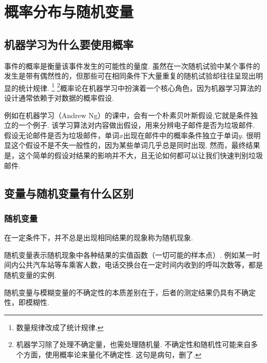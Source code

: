\section{概率分布与随机变量}
\label{ux6982ux7387ux5206ux5e03ux4e0eux968fux673aux53d8ux91cf}
\subsection{机器学习为什么要使用概率}
\label{ux673aux5668ux5b66ux4e60ux4e3aux4ec0ux4e48ux8981ux4f7fux7528ux6982ux7387}

事件的概率是衡量该事件发生的可能性的量度.
虽然在一次随机试验中某个事件的发生是带有偶然性的，但那些可在相同条件下大量重复的随机试验却往往呈现出明显的统计规律.
\footnote{数量规律改成了统计规律.}
\footnote{​机器学习除了处理不确定量，也需处理随机量.
  不确定性和随机性可能来自多个方面，使用概率论来量化不确定性.
  这句是病句，删了.}
​概率论在机器学习中扮演着一个核心角色，因为机器学习算法的设计通常依赖于对数据的概率假设.
\begin{remark}
  例如在机器学习（Andrew Ng）的课中，会有一个朴素贝叶斯假设,它就是条件独立的一个例子.
  该学习算法对内容做出假设，用来分辨电子邮件是否为垃圾邮件.
  假设无论邮件是否为垃圾邮件，单词$x$出现在邮件中的概率条件独立于单词$y$.
  很明显这个假设不是不失一般性的，因为某些单词几乎总是同时出现.
  然而，最终结果是，这个简单的假设对结果的影响并不大，且无论如何都可以让我们快速判别垃圾邮件.
\end{remark}

\subsection{变量与随机变量有什么区别}
\label{ux53d8ux91cfux4e0eux968fux673aux53d8ux91cfux6709ux4ec0ux4e48ux533aux522b}

\subsubsection{随机变量}
\label{sec:4.2.1}
\begin{defination}
  在一定条件下，并不总是出现相同结果的现象称为随机现象.
\end{defination}
\begin{defination}
  随机变量表示随机现象中各种结果的实值函数（一切可能的样本点）.
  例如某一时间内公共汽车站等车乘客人数，电话交换台在一定时间内收到的呼叫次数等，都是随机变量的实例.  
\end{defination}
\begin{note}
​随机变量与模糊变量的不确定性的本质差别在于，后者的测定结果仍具有不确定性，即模糊性.  
\end{note}

